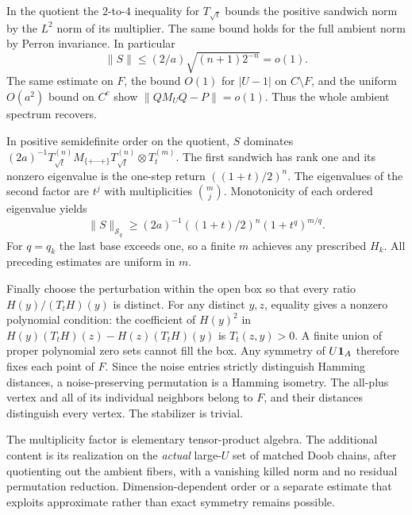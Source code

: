 In the quotient the $2$-to-$4$ inequality for $T_{\sqrt t}$ bounds
the positive sandwich norm by the $L^2$ norm of its multiplier.
The same bound holds for the full ambient norm by Perron invariance.
In particular
\[
 \|S\|\le (2/a)\sqrt{(n+1)2^{-n}}=o(1).
\]
The same estimate on $F$, the bound $O(1)$ for $|U-1|$ on
$C\setminus F$, and the uniform $O(a^2)$ bound on $C^c$ show
$\|QM_UQ-P\|=o(1)$. Thus the whole ambient spectrum recovers.

In positive semidefinite order on the quotient, $S$ dominates
$(2a)^{-1} T_{\sqrt t}^{(n)}M_{\{+\cdots+\}}T_{\sqrt t}^{(n)}
\otimes T_t^{(m)}$. The first sandwich has rank one and its
nonzero eigenvalue is the one-step return $((1+t)/2)^n$.
The eigenvalues of the second factor are $t^j$ with multiplicities
$\binom mj$. Monotonicity of each ordered eigenvalue yields
\[
 \|S\|_{\mathcal S_q}\ge (2a)^{-1}
       ((1+t)/2)^n(1+t^q)^{m/q}.
\]
For $q=q_k$ the last base exceeds one, so a finite $m$ achieves
any prescribed $H_k$. All preceding estimates are uniform in $m$.

Finally choose the perturbation within the open box so that every ratio
$H(y)/(T_tH)(y)$ is distinct. For any distinct $y,z$, equality gives
a nonzero polynomial condition: the coefficient of $H(y)^2$ in
$H(y)(T_tH)(z)-H(z)(T_tH)(y)$ is $T_t(z,y)>0$. A finite union of
proper polynomial zero sets cannot fill the box. Any symmetry of
$U{\bf1}_A$ therefore fixes each point of $F$. Since the noise entries
strictly distinguish Hamming distances, a noise-preserving permutation
is a Hamming isometry. The all-plus vertex and all of its individual
neighbors belong to $F$, and their distances distinguish every vertex.
The stabilizer is trivial.

The multiplicity factor is elementary tensor-product algebra. The
additional content is its realization on the \emph{actual} large-$U$
set of matched Doob chains, after quotienting out the ambient fibers,
with a vanishing killed norm and no residual permutation reduction.
Dimension-dependent order or a separate estimate that exploits
approximate rather than exact symmetry remains possible.

